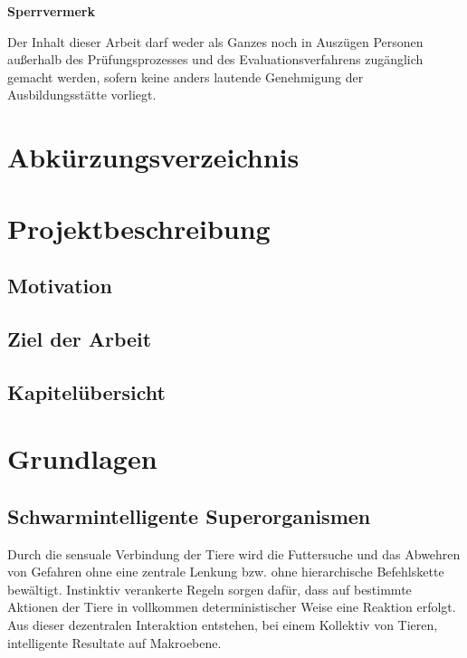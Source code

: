 \documentclass[a4paper, 11pt]{article}
\makeatletter
\newcommand*{\maintoc}{
	\begingroup
	\@fileswfalse
	\renewcommand*{\appendixattoc}{
		\value{tocdepth}=-10000
	}
	\tableofcontents
	\endgroup
}
\newcommand*{\appendixattoc}{
}
\makeatother
\begin{document}
\newpage
\begin{framed}
	\begin{center}
		\Large\bfseries Sperrvermerk
	\end{center}
	\medskip
	\noindent
	Der Inhalt dieser Arbeit darf weder als Ganzes noch in Auszügen Personen
	außerhalb des Prüfungsprozesses und des Evaluationsverfahrens zugänglich gemacht
	werden, sofern keine anders lautende Genehmigung der Ausbildungsstätte vorliegt.
\end{framed}
\newpage
{}
\renewcommand{\abstractname}{Zusammenfassung}
\begin{abstract}
\end{abstract}
\newpage
\maintoc           %
\newpage
\listoffigures             %
\newpage
\listoftables              %
\newpage
\section*{\Large \textbf Abkürzungsverzeichnis}  
\begin{acronym}[Bash]
\end{acronym}
\newpage
{} 
\section{Projektbeschreibung}
\subsection{Motivation}

\subsection{Ziel der Arbeit}
\subsection{Kapitelübersicht}
\newpage
\section{Grundlagen}
\subsection{Schwarmintelligente Superorganismen}
Durch die sensuale Verbindung der Tiere wird die Futtersuche und das Abwehren von Gefahren ohne eine zentrale Lenkung bzw. ohne hierarchische Befehlskette bewältigt. Instinktiv verankerte Regeln sorgen dafür, dass auf bestimmte Aktionen der Tiere in vollkommen deterministischer Weise eine Reaktion erfolgt. Aus dieser dezentralen Interaktion entstehen, bei einem Kollektiv von Tieren, intelligente Resultate auf Makroebene.
\end{document}
